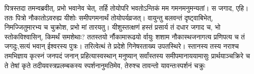 \vakya पित्रस्तदा तमन्वब्रवीत्, प्रभो भवानेव चेत्, तर्हि तोयोपरि भवतोऽन्तिकं मम गमनमनुमन्यतां।
\vakya स जगाद, एहि। ततः पित्रो नौकातोऽवरुह्य यीशोः समीपगमनार्थं तोयोपर्यव्रजत्।
\vakya वायुन्तु बलवन्तं दृष्ट्वाबिभेत्, निमज्जितुमारभ्य च चुक्रोश, प्रभो मां तारयतु।
\vakya यीशुस्तत्क्षणं हस्तं प्रसार्य तं दधार जगाद च, भो स्तोकविश्वासिन्, किमर्थं समशेथाः?
\vakya ततस्तयो र्नौकामारूढयो र्वायुः शशाम
\vakya नौकास्थजनागत्य प्रणिपत्य च तं जगदुः,सत्यं भवान् ईश्वरस्य पुत्रः।
\vakya तरित्वेत्थं ते प्रदेशे गिनेषरताख्य उपतस्थिरे। स्तानस्य तस्य नराश्च तमभिज्ञाय
\vakya कृत्स्नं जनपदं जनान् प्रहित्यास्वस्थान् मनुष्यान् सर्वांस्तस्य समीपमानाययामासुः
\vakya प्रार्थयाञ्चक्रिरे च ते तेषां कृते तदीयवस्त्रप्रलम्बकस्य स्पर्शनानुमतिमेव, तेरुश्च तावन्तो यावन्तःस्पर्शनं चक्रुः\eoc